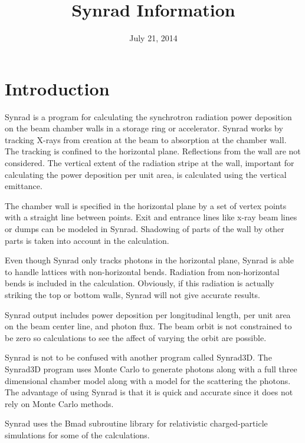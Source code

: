 \documentclass[11pt]{article}
\title{ Synrad Information}
\author{}
\date{July 21, 2014}
\begin{document}
\maketitle

\section{Introduction} 

Synrad is a program for calculating the synchrotron radiation power
deposition on the beam chamber walls in a storage ring or
accelerator. Synrad works by tracking X-rays from creation at the
beam to absorption at the chamber wall. The tracking is confined to
the horizontal plane. Reflections from the wall are not considered.
The vertical extent of the radiation stripe at the wall, important for
calculating the power deposition per unit area, is calculated using
the vertical emittance.

The chamber wall is specified in the horizontal plane by a set of
vertex points with a straight line between points. Exit and entrance
lines like x-ray beam lines or dumps can be modeled in Synrad.
Shadowing of parts of the wall by other parts is taken into account in
the calculation.

Even though Synrad only tracks photons in the horizontal plane, Synrad
is able to handle lattices with non-horizontal bends. Radiation from
non-horizontal bends is included in the calculation. Obviously, if
this radiation is actually striking the top or bottom walls, Synrad
will not give accurate results.

Synrad output includes power deposition per longitudinal length, per
unit area on the beam center line, and photon flux. The beam orbit is
not constrained to be zero so calculations to see the affect of
varying the orbit are possible.

Synrad is not to be confused with another program called Synrad3D.
The Synrad3D program uses Monte Carlo to generate photons along with a
full three dimensional chamber model along with a model for the
scattering the photons. The advantage of using Synrad is that it is
quick and accurate since it does not rely on Monte Carlo methods.

Synrad uses the Bmad subroutine library for relativistic
charged-particle simulations\cite{b:bmad} for some of the
calculations. 

\end{document}

